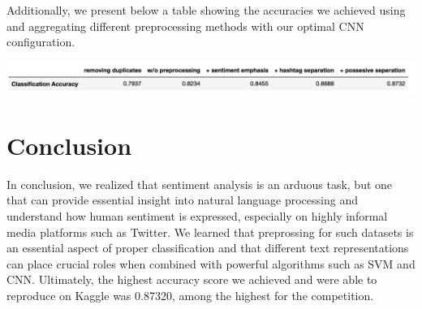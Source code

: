 \documentclass[10pt,conference]{IEEEtran}
\begin{document}
Additionally, we present below a table showing the accuracies we achieved using and aggregating different preprocessing methods  with our optimal CNN configuration.

\bigskip
\includegraphics[scale=0.30]{classification_accuracies}
\medskip

\section*{Conclusion}
In conclusion, we realized that sentiment analysis is an arduous task, but one that can provide essential insight into natural language processing and understand how human sentiment is expressed, especially on highly informal media platforms such as Twitter. We learned that preprossing for such datasets is an essential aspect of proper classification and that different text representations can place crucial roles when combined with powerful algorithms such as SVM and CNN. Ultimately, the highest accuracy score we achieved and were able to reproduce on Kaggle was 0.87320, among the highest for the competition. 



\end{document}
